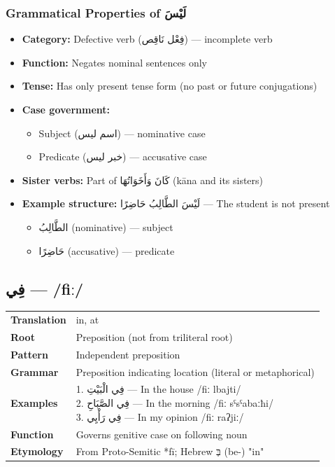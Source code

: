\documentclass[letterpaper,12pt]{article}
\begin{document}
\subsubsection*{Grammatical Properties of \textarabic{لَيْسَ}}
\begin{itemize}
  \item \textbf{Category:} Defective verb (\textarabic{فِعْل نَاقِص}) — incomplete verb
  \item \textbf{Function:} Negates nominal sentences only
  \item \textbf{Tense:} Has only present tense form (no past or future conjugations)
  \item \textbf{Case government:}
    \begin{itemize}
      \item Subject (\textarabic{اسم ليس}) — nominative case
      \item Predicate (\textarabic{خبر ليس}) — accusative case
    \end{itemize}
  \item \textbf{Sister verbs:} Part of \textarabic{كَانَ وَأَخَوَاتُهَا} (kāna and its sisters)
  \item \textbf{Example structure:} \textarabic{لَيْسَ الطَّالِبُ حَاضِرًا} — The student is not present
    \begin{itemize}
      \item \textarabic{الطَّالِبُ} (nominative) — subject
      \item \textarabic{حَاضِرًا} (accusative) — predicate
    \end{itemize}
\end{itemize}

\subsection{\textarabic{فِي} — /fiː/}
\begin{tabular}{p{3cm}p{10cm}}
\toprule
\textbf{Translation} & in, at \\
\textbf{Root} & Preposition (not from triliteral root) \\
\textbf{Pattern} & Independent preposition \\
\textbf{Grammar} & Preposition indicating location (literal or metaphorical) \\
\midrule
\textbf{Examples} & \makecell[l]{\parbox{9.5cm}{
1. \textarabic{فِي الْبَيْتِ} — In the house /fiː lbajti/\\
2. \textarabic{فِي الصَّبَاحِ} — In the morning /fiː sˤsˤabaːħi/\\
3. \textarabic{فِي رَأْيِي} — In my opinion /fiː raʔjiː/
}} \\
\midrule
\textbf{Function} & Governs genitive case on following noun \\
\textbf{Etymology} & From Proto-Semitic *fī; Hebrew \texthebrew{בְּ} (be-) "in" \\
\bottomrule
\end{tabular}
\end{document}
